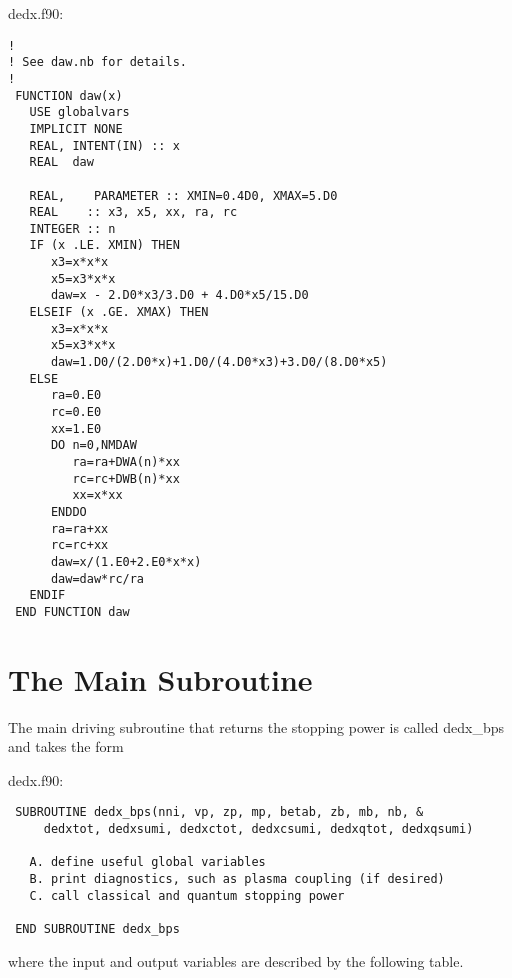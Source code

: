 \documentclass[preprint,12pt,eqsecnum,nofootinbib,amsmath,amssymb]{revtex4}
\begin{document}
\vskip1cm 

{
\noindent
dedx.f90:
\baselineskip12pt
\begin{verbatim}
!
! See daw.nb for details.
!
 FUNCTION daw(x)
   USE globalvars
   IMPLICIT NONE
   REAL, INTENT(IN) :: x
   REAL  daw

   REAL,    PARAMETER :: XMIN=0.4D0, XMAX=5.D0
   REAL    :: x3, x5, xx, ra, rc
   INTEGER :: n
   IF (x .LE. XMIN) THEN
      x3=x*x*x
      x5=x3*x*x
      daw=x - 2.D0*x3/3.D0 + 4.D0*x5/15.D0
   ELSEIF (x .GE. XMAX) THEN
      x3=x*x*x
      x5=x3*x*x
      daw=1.D0/(2.D0*x)+1.D0/(4.D0*x3)+3.D0/(8.D0*x5)
   ELSE
      ra=0.E0
      rc=0.E0
      xx=1.E0
      DO n=0,NMDAW
         ra=ra+DWA(n)*xx
         rc=rc+DWB(n)*xx
         xx=x*xx
      ENDDO
      ra=ra+xx
      rc=rc+xx
      daw=x/(1.E0+2.E0*x*x)
      daw=daw*rc/ra
   ENDIF
 END FUNCTION daw
\end{verbatim}
}


\newpage
\section{The Main Subroutine}

The main driving subroutine that returns the stopping power
is called dedx\_bps and takes the form
\vskip0.75cm

{
\noindent
dedx.f90:
\baselineskip12pt
\begin{verbatim}
 SUBROUTINE dedx_bps(nni, vp, zp, mp, betab, zb, mb, nb, &
     dedxtot, dedxsumi, dedxctot, dedxcsumi, dedxqtot, dedxqsumi)

   A. define useful global variables
   B. print diagnostics, such as plasma coupling (if desired)
   C. call classical and quantum stopping power

 END SUBROUTINE dedx_bps
\end{verbatim}
}

\noindent
where the input and output variables are described by the
following table.
\end{document}
